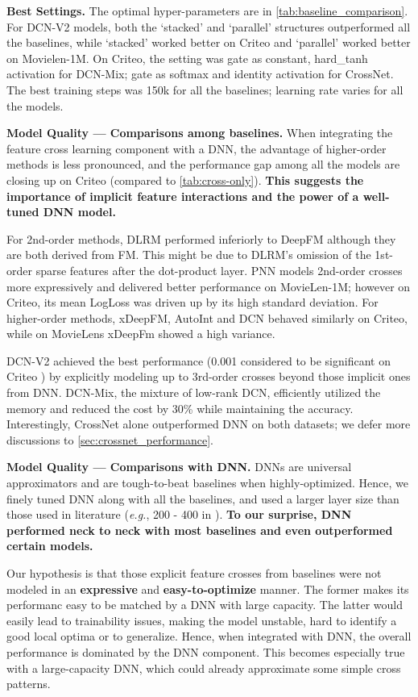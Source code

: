 \documentclass[sigconf]{acmart}
\begin{document}
{\bf Best Settings.} The optimal hyper-parameters are in \autoref{tab:baseline_comparison}. For {DCN-V2} models, both the `stacked' and `parallel' structures outperformed all the baselines, while `stacked' worked better on Criteo and `parallel' worked better on Movielen-1M. On Criteo, the setting was gate as constant, hard\_tanh activation for {DCN-Mix}; gate as softmax and identity activation for CrossNet. The best training steps was 150k for all the baselines; learning rate varies for all the models.



{\bf Model Quality --- Comparisons among baselines.} When integrating the feature cross learning component with a DNN, the advantage of higher-order methods is less pronounced, and the performance gap among all the models are closing up on Criteo (compared to \autoref{tab:cross-only}). \textbf{This suggests the importance of implicit feature interactions and the power of a well-tuned DNN model.}

For 2nd-order methods, DLRM performed inferiorly to DeepFM although they are both derived from FM. This might be due to DLRM's omission of the 1st-order sparse features after the dot-product layer. PNN models 2nd-order crosses more expressively and delivered better performance on MovieLen-1M; however on Criteo, its mean LogLoss was driven up by its high standard deviation. For higher-order methods, xDeepFM, AutoInt and DCN behaved similarly on Criteo, while on MovieLens xDeepFm showed a high variance.

{DCN-V2} achieved the best performance (0.001 considered to be significant on Criteo \cite{wang2017deep, lian2018xdeepfm, song2019autoint}) by explicitly modeling up to 3rd-order crosses beyond those implicit ones from DNN. {DCN-Mix}, the mixture of low-rank DCN, efficiently utilized the memory and reduced the cost by 30\% while maintaining the accuracy. Interestingly, CrossNet alone outperformed DNN on both datasets; we defer more discussions to \autoref{sec:crossnet_performance}.


{\bf Model Quality --- Comparisons with DNN.} DNNs are universal approximators and are tough-to-beat baselines when highly-optimized. Hence, we finely tuned DNN along with all the baselines, and used a larger layer size than those used in literature (\emph{e.g.}, 200 - 400 in \cite{lian2018xdeepfm, song2019autoint}). \textbf{To our surprise, DNN performed neck to neck with most baselines and even outperformed certain models.} 

Our hypothesis is that those explicit feature crosses from baselines were not modeled in an {\bf expressive} and {\bf easy-to-optimize} manner. The former makes its performanc easy to be matched by a DNN with large capacity. The latter would easily lead to trainability issues, making the model unstable, hard to identify a good local optima or to generalize. Hence, when integrated with DNN, the overall performance is dominated by the DNN component. This becomes especially true with a large-capacity DNN, which could already approximate some simple cross patterns.
\end{document}

